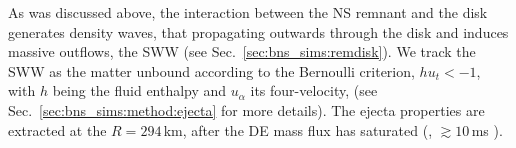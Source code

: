 %    



As was discussed above, the interaction between the \ac{NS} remnant and the disk 
generates density waves, that propagating outwards through the disk and induces massive outflows, the \ac{SWW} (see Sec.~\ref{sec:bns_sims:remdisk}).
%
We track the \ac{SWW} as the matter unbound according to the Bernoulli criterion,
$hu_t < -1$, with $h$ being the fluid enthalpy and $u_{\alpha}$ its four-velocity,
(see Sec.~\ref{sec:bns_sims:method:ejecta} for more details). 
%
The ejecta properties are extracted at the $R=294\,$km, after the \ac{DE} mass 
flux has saturated (\eg, ${\gtrsim}10\,$ms \pmerg{}).
%
%


